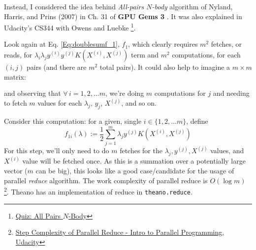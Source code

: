 \documentclass[10pt]{amsart}
\begin{document}
\begin{multicols*}{2}
Instead, I considered the idea behind \emph{All-pairs $N$-body} algorithm of Nyland, Harris, and Prins (2007) in Ch. 31 of \textbf{GPU Gems 3} \cite{Ngu2007}.  It was also explained in Udacity's CS344 with Owens and Luebke \cite{CS344} \footnote{\href{https://classroom.udacity.com/courses/cs344/lessons/116611037/concepts/1198442170923\#}{Quiz: All Pairs $N$-Body}}.  

Look again at Eq. \ref{Eq:doublesumf_1}, $f_1$, which clearly requires $m^2$ fetches, or reads, for $\lambda_i \lambda_j y^{(i)} y^{(j)} K(X^{(i)},X^{(j)})$ term and $m^2$ computations, for each $(i,j)$ pairs (and there are $m^2$ total pairs).  It could also help to imagine a $m\times m$ matrix:



and observing that $\forall \, i=1,2,\dots m$, we're doing $m$ computations for $j$ and needing to fetch $m$ values for each $\lambda_j$, $y_j$, $X^{(j)}$, and so on.

Consider this computation: for a given, single $i\in \lbrace 1,2,\dots m\rbrace$, define 
\begin{equation}
f_{1i}(\lambda) := \frac{1}{2} \sum_{j=1}^m \lambda_j y^{(j)} K(X^{(i)},X^{(j)})
\end{equation}
For this step, we'll only need to do $m$ fetches for the $\lambda_j,y^{(j)},X^{(j)}$ values, and $X^{(i)}$ value will be fetched once.  As this is a summation over a potentially large vector ($m$ can be big), this looks like a good case/candidate for the usage of parallel \emph{reduce} algorithm.  The work complexity of parallel reduce is $O(\log{m})$ \cite{CS344}\footnote{\href{https://youtu.be/tSgVVVTe5KQ}{Step Complexity of Parallel Reduce - Intro to Parallel Programming, Udacity}}.  Theano has an implementation of reduce in \verb|theano.reduce|.


\end{multicols*}
\end{document}
